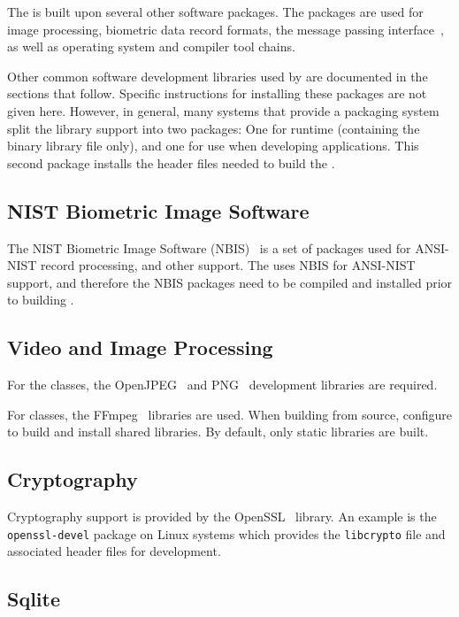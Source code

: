 The \lname is built upon several other software packages. The packages are
used for image processing, biometric data record formats, the message
passing interface~\cite{mpi}, as well as operating system and compiler
tool chains.

Other common software development libraries used by \sname are documented in
the sections that follow. Specific instructions for installing these packages
are not given here. However, in general, many systems that provide a packaging
system split the library support into two packages: One for runtime (containing
the binary library file only), and one for use when developing applications.
This second package installs the header files needed to build the \sname.

\subsection{NIST Biometric Image Software}

The NIST Biometric Image Software (NBIS)~\cite{nist:nbis} is a set of packages
used for ANSI-NIST record processing, and other support. The \lname uses NBIS
for ANSI-NIST support, and therefore the NBIS packages need to be compiled and
installed prior to building \sname.

\subsection{Video and Image Processing}

For the  classes, the OpenJPEG~\cite{libopenjpeg} and
PNG~\cite{libpng} development libraries are required.

For  classes, the FFmpeg~\cite{libffmpeg} libraries are used.
When building from source, configure to build and
install shared libraries. By default, only static libraries are built.

\subsection{Cryptography}

Cryptography support is provided by the OpenSSL~\cite{openssl} library.
An example is the \texttt{openssl-devel} package on Linux systems which
provides the \texttt{libcrypto} file and associated header files for
development.

\subsection{Sqlite}

